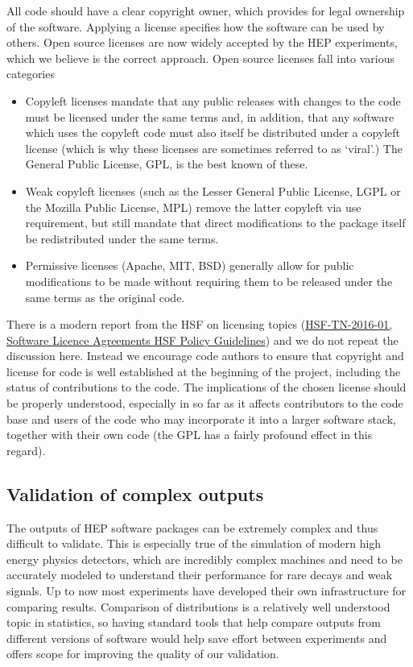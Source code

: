 \documentclass[12pt,a4paper]{article}
\begin{document}
All code should have a clear copyright owner, which provides for legal
ownership of the software. Applying a license specifies how the software
can be used by others. Open source licenses are now widely accepted by
the HEP experiments, which we believe is the correct approach. Open
source licenses fall into various categories

\begin{itemize}
\item
    Copyleft licenses mandate that any public releases with changes to the
  code must be licensed under the same terms and, in addition, that any
  software which uses the copyleft code must also itself be distributed
  under a copyleft license (which is why these licenses are sometimes
  referred to as `viral'.) The General Public License, GPL, is the best
  known of these.
  \item
    Weak copyleft licenses (such as the Lesser General Public License,
  LGPL or the Mozilla Public License, MPL) remove the latter copyleft
  via use requirement, but still mandate that direct modifications to
  the package itself be redistributed under the same terms.
  \item
    Permissive licenses (Apache, MIT, BSD) generally allow for public
  modifications to be made without requiring them to be released under
  the same terms as the original code.
  \end{itemize}

There is a modern report from the HSF on licensing topics
(\href{http://hepsoftwarefoundation.org/notes/HSF-TN-2016-01.pdf}{{HSF-TN-2016-01,
Software Licence Agreements HSF Policy Guidelines}}) and we do not
repeat the discussion here. Instead we encourage code authors to ensure
that copyright and license for code is well established at the beginning
of the project, including the status of contributions to the code. The
implications of the chosen license should be properly understood,
especially in so far as it affects contributors to the code base and
users of the code who may incorporate it into a larger software stack,
together with their own code (the GPL has a fairly profound effect in
this regard).~

\hypertarget{validation-of-complex-outputs}{%
\subsection{Validation of complex
outputs}\label{validation-of-complex-outputs}}

The outputs of HEP software packages can be extremely complex and thus
difficult to validate. This is especially true of the simulation of
modern high energy physics detectors, which are incredibly complex
machines and need to be accurately modeled to understand their
performance for rare decays and weak signals. Up to now most experiments
have developed their own infrastructure for comparing results.
Comparison of distributions is a relatively well understood topic in
statistics, so having standard tools that help compare outputs from
different versions of software would help save effort between
experiments and offers scope for improving the quality of our
validation.
\end{document}
